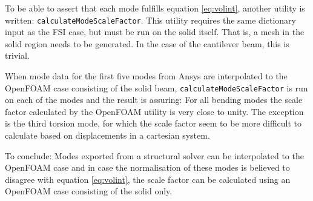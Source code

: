 To be able to assert that each mode fulfills equation \ref{eq:volint},
another utility is written: \texttt{calculateModeScaleFactor}. This
utility requires the same dictionary input as the FSI case, but must
be run on the solid itself. That is, a mesh in the solid region needs
to be generated. In the case of the cantilever beam, this is trivial.

When mode data for the first five modes from Ansys are interpolated to the
OpenFOAM case consisting of the solid beam, \texttt{calculateModeScaleFactor}
is run on each of the modes and the result is assuring: For all bending modes
the scale factor calculated by the OpenFOAM utility is very close to unity.
The exception is the third torsion mode, for which the scale factor seem to
be more difficult to calculate based on displacements in a cartesian system.

To conclude: Modes exported from a structural solver can be interpolated
to the OpenFOAM case and in case the normalisation of these modes is believed
to disagree with equation \ref{eq:volint}, the scale factor can be calculated
using an OpenFOAM case consisting of the solid only.
